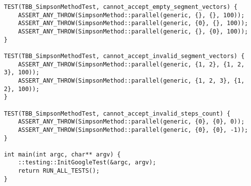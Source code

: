 \documentclass{report}
\begin{document}
\begin{lstlisting}
TEST(TBB_SimpsonMethodTest, cannot_accept_empty_segment_vectors) {
    ASSERT_ANY_THROW(SimpsonMethod::parallel(generic, {}, {}, 100));
    ASSERT_ANY_THROW(SimpsonMethod::parallel(generic, {0}, {}, 100));
    ASSERT_ANY_THROW(SimpsonMethod::parallel(generic, {}, {0}, 100));
}

TEST(TBB_SimpsonMethodTest, cannot_accept_invalid_segment_vectors) {
    ASSERT_ANY_THROW(SimpsonMethod::parallel(generic, {1, 2}, {1, 2, 3}, 100));
    ASSERT_ANY_THROW(SimpsonMethod::parallel(generic, {1, 2, 3}, {1, 2}, 100));
}

TEST(TBB_SimpsonMethodTest, cannot_accept_invalid_steps_count) {
    ASSERT_ANY_THROW(SimpsonMethod::parallel(generic, {0}, {0}, 0));
    ASSERT_ANY_THROW(SimpsonMethod::parallel(generic, {0}, {0}, -1));
}

int main(int argc, char** argv) {
    ::testing::InitGoogleTest(&argc, argv);
    return RUN_ALL_TESTS();
}
\end{lstlisting}
\end{document}
